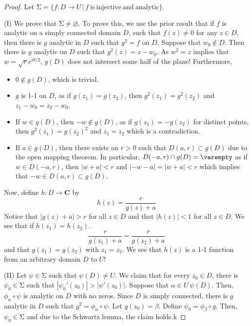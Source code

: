 \begin{proof}
Let $\mathrm{\Sigma}=\{f:D\rightarrow U \,|\,f\mathrm{\ is\ injective\ and\ analytic} \}$.

\bigskip

(I) We prove that $\mathrm{\Sigma} \ne \varnothing$. To prove this, we use the prior result that if $f$ is analytic on a simply connected domain $D$, such that $f(z)\ne 0$ for any $z\in D$, then there is $g$ analytic in $D$ such that $g^2=f$ on $D$. Suppose that $w_0\notin D$. Then there is $g$ analytic on $D$ such that $g^2(z)=z-w_0$. As $w^2=z$ implies that $w=\sqrt{r}e^{i\theta /2}$, $g(D)$ does not intersect some half of the plane! Furthermore,
\begin{itemize}
\item[(i)] $0\notin g(D)$, which is trivial. 
\item[(ii)] $g$ is 1-1 on $D$, as if $g(z_1)=g(z_2)$, then $g^2(z_1)=g^2(z_2)$ and $z_1-w_0=z_2-w_0$.
\item[(iii)] If $w\in g(D)$, then $-w\notin g(D)$, as if $g(z_1)=-g(z_2)$ for distinct points, then $g^2(z_1)=g(z_2)^2$ and $z_1=z_2$ which is a contradiction.
\item[(iv)] If $a\in g(D)$, then there exists an $r>0$ such that $D(a,r)\subset g(D)$ due to the open mapping theorem. In particular, $D(-a,r)\cap g(D)=\varempty$ as if $w\in D(-a,r)$, then $|w+a|<r$ and $|-w-a|=|w+a|<r$ which implies that $-w\in D(a,r)\subset g(D)$. 
\end{itemize}
Now, define $h:D\rightarrow {\bm C}$ by 
\[h(z)=\dfrac{r}{g(z)+a}\]
Notice that $|g(z)+a|>r$ for all $z\in D$ and that $|h(z)|<1 $ for all $z\in D$. We see that if $h(z_1)=h(z_2)$.
\[\dfrac{r}{g(z_1)+a}=\dfrac{r}{g(z_2)+a}\]
and that $g(z_1)=g(z_2)$ with $z_1=z_2$. We see that $h(z)$ is a 1-1 function from an arbitrary domain $D$ to $U$!

\bigskip 

(II) Let $\psi \in \mathrm{\Sigma} $ such that $\psi (D)\ne U$. We claim that for every $z_0\in D$, there is $\psi_0\in \mathrm{\Sigma} $ such that $|\psi_0'(z_0)|>|\psi '(z_0)|$. Suppose that $\alpha \in U\ \psi (D)$. Then, $\phi _{\alpha }\circ \psi $ is analytic on $D$ with no zeros. Since $D$ is simply connected, there is $g$ analytic in $D$ such that $g^2=\phi _{\alpha }\circ \psi $. Let $g(z_0)=\beta $. Define $\psi_0=\phi _{\beta }\circ g$. Then, $\psi_0\in \mathrm{\Sigma} $ and due to the Schwartz lemma, the claim holds.k
\end{proof}
\vspace{2ex}

